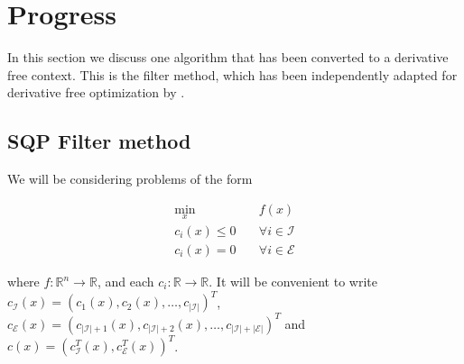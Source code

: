 \documentclass{article}
\begin{document}
%
%

\section{Progress}

In this section we discuss one algorithm that has been converted to a derivative free context.
This is the filter method, which has been independently adapted for derivative free optimization by \cite{DUMMY:Brekelman}.


\subsection{SQP Filter method}

We will be considering problems of the form


\begin{center}
\begin{align}
\label{problem}
\min_x & \quad f(x) \\
  c_i(x) \le 0   & \quad \forall i \in \mathcal {I} \nonumber \\
  c_i(x)  = 0    & \quad \forall i \in \mathcal {E} \nonumber
\end{align}
\end{center}
where $f : \mathbb R^n \to \mathbb R$, and each $c_i : \mathbb{R} \to \mathbb{R}$.
It will be convenient to write
$c_{\mathcal {I}}(x) = (c_1(x), c_2(x), \ldots, c_{|\mathcal{I}|})^T$,
$c_{\mathcal {E}}(x) = (c_{|\mathcal{I}|+1}(x), c_{|\mathcal{I}|+2}(x), \ldots, c_{|\mathcal{I}| + |\mathcal{E}|})^T$ and
$c(x) = (c_{\mathcal{I}}^T(x), c_{\mathcal{E}}^T(x))^T$.
\end{document}
